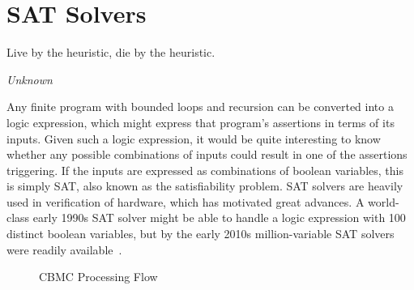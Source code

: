 
\section{SAT Solvers}
\label{sec:formal:SAT Solvers}
%
\epigraph{Live by the heuristic, die by the heuristic.}{\emph{Unknown}}

Any finite program with bounded loops and recursion can be converted
into a logic expression, which might express that program's assertions
in terms of its inputs.
Given such a logic expression, it would be quite interesting to know
whether any possible combinations of inputs could result in one of
the assertions triggering.
If the inputs are expressed as combinations of boolean variables,
this is simply SAT, also known as the satisfiability problem.
SAT solvers are heavily used in verification of hardware, which has
motivated great advances.
A world-class early 1990s SAT solver might be able to handle a logic
expression with 100 distinct boolean variables, but by the early 2010s
million-variable SAT solvers were readily
available~\cite{Kroening:2008:DPA:1391237}.

\begin{figure}[tbp]
\centering
{}
\caption{CBMC Processing Flow}
\label{fig:formal:CBMC Processing Flow}
\end{figure}

